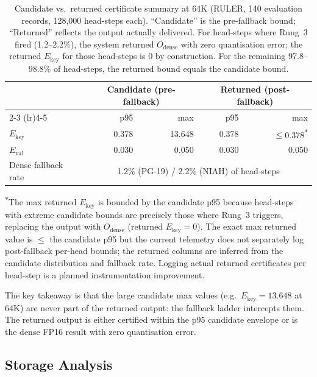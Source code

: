 \documentclass[10pt,twocolumn,a4paper]{article}
\theoremstyle{definition}
\theoremstyle{remark}
\begin{document}
\begin{table}[!t]
\centering
\caption{Candidate vs.\ returned certificate summary at 64K (RULER, 140 evaluation records, 128{,}000 head-steps each).  ``Candidate'' is the pre-fallback bound; ``Returned'' reflects the output actually delivered.  For head-steps where Rung~3 fired (1.2--2.2\%), the system returned $O_{\mathrm{dense}}$ with zero quantisation error; the returned $E_{\mathrm{key}}$ for those head-steps is 0 by construction.  For the remaining 97.8--98.8\% of head-steps, the returned bound equals the candidate bound.}
\label{tab:returned_cert}
\small
\begin{tabular}{lrrrr}
\toprule
& \multicolumn{2}{c}{\textbf{Candidate (pre-fallback)}} & \multicolumn{2}{c}{\textbf{Returned (post-fallback)}} \\
\cmidrule(lr){2-3} \cmidrule(lr){4-5}
& p95 & max & p95 & max \\
\midrule
$E_{\mathrm{key}}$ & 0.378 & 13.648 & 0.378 & $\leq$0.378\textsuperscript{$\ast$} \\
$E_{\mathrm{val}}$ & 0.030 & 0.050 & 0.030 & 0.050 \\
Dense fallback rate & \multicolumn{4}{c}{1.2\% (PG-19) / 2.2\% (NIAH) of head-steps} \\
\bottomrule
\end{tabular}

\raggedright
{\footnotesize \textsuperscript{$\ast$}The max returned $E_{\mathrm{key}}$ is bounded by the candidate p95 because head-steps with extreme candidate bounds are precisely those where Rung~3 triggers, replacing the output with $O_{\mathrm{dense}}$ (returned $E_{\mathrm{key}}{=}0$).  The exact max returned value is $\leq$ the candidate p95 but the current telemetry does not separately log post-fallback per-head bounds; the returned columns are inferred from the candidate distribution and fallback rate.  Logging actual returned certificates per head-step is a planned instrumentation improvement.}
\end{table}

The key takeaway is that the large candidate max values (e.g.\ $E_{\mathrm{key}}{=}13.648$ at 64K) are never part of the returned output: the fallback ladder intercepts them.  The returned output is either certified within the p95 candidate envelope or is the dense FP16 result with zero quantisation error.

\subsection{Storage Analysis}
\label{sec:storage}
\end{document}
